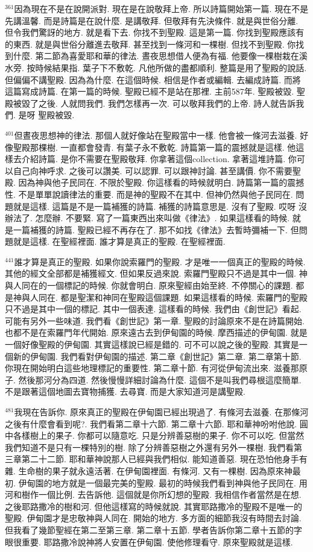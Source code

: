 \documentclass{book}
\begin{document}
$^{361}$因為現在不是在說開派對.
現在是在說敬拜上帝.
所以詩篇開始第一篇.
現在不是先講溫馨.
而是詩篇是在說什麼.
是講敬拜.
但敬拜有先決條件.
就是與世俗分離.
但令我們驚訝的地方.
就是看下去.
你找不到聖殿.
這是第一篇.
你找到聖殿應該有的東西.
就是與世俗分離進去敬拜.
甚至找到一條河和一棵樹.
但找不到聖殿.
你找到什麼.
第二節為喜愛耶和華的律法.
晝夜思想借人便為有福.
他要像一棵樹栽在溪水旁.
按時候結果指.
葉子下不敷乾.
凡他所做的盡都順利.
整篇是用了聖殿的說話.
但偏偏不講聖殿.
因為為什麼.
在這個時候.
相信是作者或編輯.
去編成詩篇.
而將這篇寫成詩篇.
在第一篇的時候.
聖殿已經不是站在那裡.
主前587年.
聖殿被毀.
聖殿被毀了之後.
人就問我們.
我們怎樣再一次.
可以敬拜我們的上帝.
詩人就告訴我們.
是呀 聖殿被毀.

$^{401}$但晝夜思想神的律法.
那個人就好像站在聖殿當中一樣.
他會被一條河去滋養.
好像聖殿那棵樹.
一直都會發青.
有葉子永不敷乾.
詩篇第一篇的震撼就是這樣.
他這樣去介紹詩篇.
是你不需要在聖殿敬拜.
你拿著這個collection.
拿著這堆詩篇.
你可以自己向神呼求.
之後可以讚美.
可以認罪.
可以跟神討論.
甚至講價.
你不需要聖殿.
因為神與他子民同在.
不限於聖殿.
你這樣看的時候就明白.
詩篇第一篇的震撼性.
不是單單說讀律法的重要.
而是神的聖殿不在其中.
但神仍然與他子民同在.
問題就是這樣.
這篇是不是一篇補獲的詩篇.
補獲的詩篇意思是.
沒有了聖殿.
哎呀 沒辦法了.
怎麼辦.
不要緊.
寫了一篇東西出來叫做《律法》.
如果這樣看的時候.
就是一篇補獲的詩篇.
聖殿已經不再存在了.
那不如找《律法》去暫時彌補一下.
但問題就是這樣.
在聖經裡面.
誰才算是真正的聖殿.
在聖經裡面.

$^{441}$誰才算是真正的聖殿.
如果你說索羅門的聖殿.
才是唯一一個真正的聖殿的時候.
其他的經文全部都是補獲經文.
但如果反過來說.
索羅門聖殿只不過是其中一個.
神與人同在的一個標記的時候.
你就會明白.
原來聖經由始至終.
不停關心的課題.
都是神與人同在.
都是聖潔和神同在聖殿這個課題.
如果這樣看的時候.
索羅門的聖殿只不過是其中一個的標記.
其中一個表達.
這樣看的時候.
我們由《創世記》看起.
可能有另外一些味道.
我們看《創世記》第一章.
聖殿的討論原來不是在詩篇開始.
也都不是在索羅門年代開始.
原來遠古去到伊甸園的時候.
摩西描述的伊甸園.
就是一個好像聖殿的伊甸園.
其實這樣說已經是錯的.
可不可以說之後的聖殿.
其實是一個新的伊甸園.
我們看對伊甸園的描述.
第二章《創世記》第二章.
第二章第十節.
你現在開始明白這些地理標記的重要性.
第二章十節.
有河從伊甸流出來.
滋養那原子.
然後那河分為四道.
然後慢慢詳細討論為什麼.
這個不是叫我們尋根這麼簡單.
不是跟著這個地圖去寶物捕獲.
去尋寶.
而是大家知道河是講聖殿.

$^{481}$我現在告訴你.
原來真正的聖殿在伊甸園已經出現過了.
有條河去滋養.
在那條河之後有什麼會看到呢?.
我們看第二章十六節.
第二章十六節.
耶和華神吩咐他說.
圓中各樣樹上的果子.
你都可以隨意吃.
只是分辨善惡樹的果子.
你不可以吃.
但當然我們知道不是只有一棵特別的樹.
除了分辨善惡樹之外還有另外一棵樹.
我們看第三章第二十二節.
耶和華神說那人已經與我們相似.
能知道善惡.
現在恐怕他身手有雜.
生命樹的果子就永遠活著.
在伊甸園裡面.
有條河.
又有一棵樹.
因為原來神最初.
伊甸園的地方就是一個最完美的聖殿.
最初的時候我們看到神與他子民同在.
用河和樹作一個比例.
去告訴他.
這個就是你所幻想的聖殿.
我相信作者當然是在想.
之後耶路撒冷的樹和河.
但他這樣寫的時候就說.
其實耶路撒冷的聖殿不是唯一的聖殿.
伊甸園才是忠敬神與人同在.
開始的地方.
多方面的細節我沒有時間去討論.
但我看了幾節聖經在第二至第三章.
第二章十五節.
學者告訴你第二章十五節的字眼很重要.
耶路撒冷說神將人安置在伊甸園.
使他修理看守.
原來聖殿就是這樣.
\end{document}

